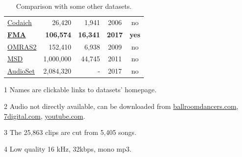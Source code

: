 \documentclass{article}
\newcommand{\ntracks}{106,574 }
\newcommand{\nartists}{16,341 }
\begin{document}
\begin{table}[t]
\begin{threeparttable}
\begin{tabular}{l@{ }rrcc}
		\href{http://jmir.sourceforge.net/index_Codaich.html}{Codaich} \cite{codaich} & 26,420 & 1,941 & 2006 & no \\ %
		\bf \href{https://github.com/mdeff/fma/}{FMA} & \bf \ntracks & \bf \nartists & \bf 2017 & \bf yes \\
		\href{http://www.omras2.org/}{OMRAS2} \cite{omras} & 152,410 & 6,938 & 2009 & no \\
		\href{https://labrosa.ee.columbia.edu/millionsong/}{MSD} \cite{msd} & 1,000,000 & 44,745 & 2011 & no\tnote{2} \\
		\href{https://research.google.com/audioset/}{AudioSet} \cite{audioset} & 2,084,320 & - & 2017 & no\tnote{2} \\
		\bottomrule
	\end{tabular}
	\begin{tablenotes}
		\item[1] Names are clickable links to datasets' homepage.
		\item[2] Audio not directly available, can be downloaded from \href{http://www.ballroomdancers.com}{ballroomdancers.com}, \href{https://www.7digital.com}{7digital.com}, \href{https://www.youtube.com}{youtube.com}.
		\item[3] The 25,863 clips are cut from 5,405 songs.
		\item[4] Low quality 16 kHz, 32kbps, mono mp3.
	\end{tablenotes}
	\end{threeparttable}
	\caption{Comparison with some other datasets.} %
	\label{tab:datasets}
\end{table}
\end{document}
